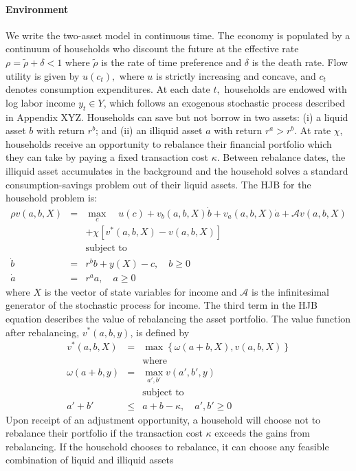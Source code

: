 \paragraph{Environment}
We write the two-asset model in continuous time. The economy is populated by a continuum of households who discount the future at the effective rate $\rho=\tilde{\rho}+\delta<1$ where $\tilde{\rho}$ is the rate of time preference and $\delta$ is the death rate. Flow utility is given by $u\left( c_{t}\right) ,$ where $u$ is strictly increasing and concave, and $c_{t}$ denotes consumption expenditures. At each date $t,$ households are endowed with log labor income $y_{t}\in Y$, which follows an exogenous stochastic process described in Appendix XYZ. Households can save but not borrow in two assets: (i) a liquid asset $b$ with return $r^{b}$; and (ii) an illiquid asset $a$ with return $r^{a}>r^{b}$. At rate $\chi$, households receive an opportunity to rebalance their financial portfolio which they can take by paying a fixed transaction cost $\kappa$. Between rebalance dates, the illiquid asset accumulates in the background and the household solves a standard consumption-savings problem out of their liquid assets. The HJB for the household problem is:
\begin{eqnarray*}
\rho v\left(a,b,X\right)&=&\max_{c} \quad u\left(c\right)+v_b\left(a,b,X\right)\dot{b} + v_a\left(a,b,X\right)\dot{a} + \mathcal{A} v\left(a,b,X\right)\label{eq:HP_2A_recursive}  \\
 && +\chi\left[v^{*}\left(a,b,X\right)-v\left(a,b,X\right)\right]  \\
 && \text{subject to}  \\
\dot{b} &=& r^{b}b+y(X)-c, \quad b\geq 0  \\
\dot{a} &=& r^{a}a, \quad a \geq 0 
\end{eqnarray*}
where $X$ is the vector of state variables for income and $\mathcal{A}$ is the infinitesimal generator of the stochastic process for income. The third term in the HJB equation describes the value of rebalancing the asset portfolio. The value function after rebalancing, $v^{*}\left(a,b,y\right)$, is defined by
\begin{eqnarray*}
v^{*}\left(a,b,X\right) &=& \max \left\{ \omega\left(a+b,X\right),v\left(a,b,X\right)\right\} \label{eq:HP_2A_rebalance} \\ 
&& \text{where} \\
\omega\left(a+b,y\right) &=& \max_{a',b'} v\left(a',b',y\right)  \\
 && \text{subject to}  \\
a'+b' & \leq & a+b-\kappa, \quad a', b' \geq 0
\end{eqnarray*}
Upon receipt of an adjustment opportunity, a household will choose not to rebalance their portfolio if the transaction cost $\kappa$ exceeds the gains from rebalancing. If the household chooses to rebalance, it can choose any feasible combination of liquid and illiquid assets 

